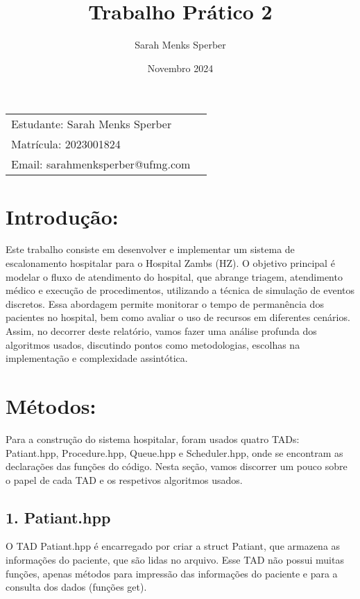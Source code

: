 \documentclass[11pt]{article}
\title{\textbf{Trabalho Prático 2}}
\author{Sarah Menks Sperber}
\date{Novembro 2024}
\begin{document}
\maketitle

\noindent\begin{tabular}{@{}ll}
    Estudante: Sarah Menks Sperber\\
    Matrícula: 2023001824\\
    Email: sarahmenksperber@ufmg.com\\
\end{tabular}

\section*{Introdução:}

    \par Este trabalho consiste em desenvolver e implementar um sistema de escalonamento hospitalar para o Hospital Zambs (HZ). O objetivo principal é modelar o fluxo de atendimento do hospital, que abrange triagem, atendimento médico e execução de procedimentos, utilizando a técnica de simulação de eventos discretos. Essa abordagem permite monitorar o tempo de permanência dos pacientes no hospital, bem como avaliar o uso de recursos em diferentes cenários.\\
    Assim, no decorrer deste relatório, vamos fazer uma análise profunda dos algoritmos usados, discutindo pontos como metodologias, escolhas na implementação e complexidade assintótica.


\section*{Métodos:}
\par Para a construção do sistema hospitalar, foram usados quatro TADs: Patiant.hpp, Procedure.hpp, Queue.hpp e Scheduler.hpp, onde se encontram as declarações das funções do código. Nesta seção, vamos discorrer um pouco sobre o papel de cada TAD e os respetivos algoritmos usados.

\subsection*{1. Patiant.hpp}
\par O TAD Patiant.hpp é encarregado por criar a struct Patiant, que armazena as informações do paciente, que são lidas no arquivo. Esse TAD não possui muitas funções, apenas métodos para impressão das informações do paciente e para a consulta dos dados (funções get).
\end{document}

